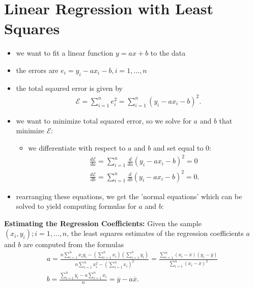 \documentclass[10pt]{article}
\begin{document}
\section{Linear Regression with Least Squares}
\begin{itemize}
    \item we want to fit a linear function $y = ax+b$ to the data
    \item the errors are $e_i = y_i - ax_i - b, i = 1, \ldots, n$ 
    \item the total sqaured error is given by 
        \begin{gather*}
            \mathcal{E} = \sum_{i=1}^{n} e_i^2 = \sum_{i=1}^{n} (y_i - ax_i - b)^2
        .\end{gather*}
    \item we want to minimize total squared error, so we solve for $a$ and $b$ that minimize $ \mathcal{E}$:
        \begin{itemize}
            \item we differentiate with respect to $a$ and $b$ and set equal to 0:
                \begin{gather*}
                    \frac{d \mathcal{E}}{d a} = \sum_{i=1}^{n} \frac{d}{d a} (y_i - ax_i - b)^2 = 0 \\ 
                    \frac{d \mathcal{E}}{d b} = \sum_{i=1}^{n} \frac{d}{d b} (y_i - ax_i - b)^2 = 0
                .\end{gather*}
        \end{itemize}
    \item rearranging these equations, we get the 'normal equations' which can be solved to yield computing formulas for $a$ and $b$:
\end{itemize}
\begin{theorem}
    \textbf{Estimating the Regression Coefficients:} Given the sample ${(x_i, y_i); i = 1,\ldots,n}$, the least squares estimates of the regression coefficients $a$ and $b$ are computed from the formulas 
    \begin{gather*}
        a = \frac{n \sum_{i=1}^{n} x_iy_i - \left( \sum_{i=1}^{n} x_i \right) \left( \sum_{i=1}^{n} y_i \right)}{n \sum_{i=1}^{n} x_i^2 - \left( \sum_{i=1}^{n} x_i \right)^2} =\frac{\sum_{i=1}^{n} (x_i-\overline{x})(y_i-\overline{y})}{\sum_{i=1}^{n} (x_i-\overline{x})^2} \\ 
        b = \frac{\sum_{i=1}^{n} y_i-a \sum_{i=1}^{n} x_i}{n} = \overline{y}-a\overline{x}
    .\end{gather*}
\end{theorem}
\end{document}
